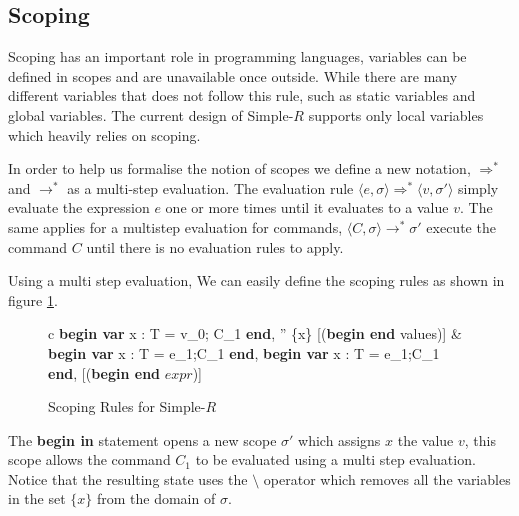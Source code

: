 \documentclass[a4paper,12pt]{report}
\begin{document}
\subsection{Scoping}
Scoping has an important role in programming languages, variables can be defined 
in scopes and are unavailable once outside. While there are many different 
variables that does not follow this rule, such as static variables and global 
variables. The current design of Simple-$R$ supports only local variables which 
heavily relies on scoping. 

\par
In order to help us formalise the notion of scopes we define a new notation, 
$\Longrightarrow^{*}$ and $\longrightarrow^{*}$ as a multi-step evaluation. 
The evaluation rule $\langle e, \sigma \rangle \Longrightarrow^{*} 
\langle v, \sigma' \rangle$ simply 
evaluate the expression $e$ one or more times until it evaluates to a value $v$. 
The same applies for a multistep evaluation for commands, 
$\langle C, \sigma \rangle \longrightarrow^{*} \sigma'$ execute the command $C$ 
until there is no evaluation rules to apply. 

\par
Using a multi step evaluation, We can easily define the scoping rules as shown 
in figure \ref{fig:scoping_rules}.
  
\begin{figure}[H]
  \begin{center}
    \begin{tabular}{c}
      {\langle\textbf{begin var }x : T = v_0; C_1 \textbf{ end}, \sigma \rangle 
      \longrightarrow \sigma'' \setminus \{x\}} [(\textbf{begin end} values)] 
      & \\
      \footnotesize
      {\langle \textbf{begin var }x : T = e_1;C_1\textbf{ end}, \sigma \rangle 
      \Longrightarrow \langle\textbf{begin var }x : T = e_1;C_1\textbf{ end}, \sigma \rangle} 
      [(\textbf{begin end} $expr$)]
      \normalsize
    \end{tabular}
  \end{center}
  \caption{Scoping Rules for Simple-$R$}
  \label{fig:scoping_rules}
\end{figure}

\par
The \textbf{begin in} statement opens a new scope $\sigma'$ which 
assigns $x$ the value $v$, this scope allows the command $C_1$ to be evaluated 
using a multi step evaluation. Notice that the resulting state 
uses the $\setminus$ operator which removes all the variables 
in the set $\{x\}$ from the domain of $\sigma$. 
\end{document}
